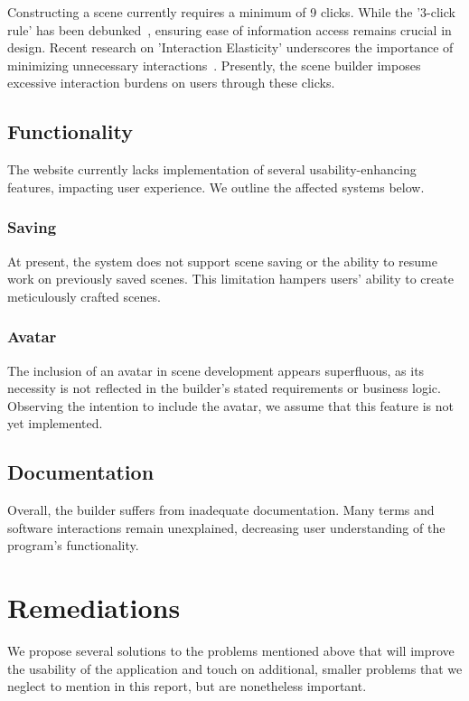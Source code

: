 \documentclass[sigart]{acmart_mod} %
\begin{document}
Constructing a scene currently requires a minimum of 9 clicks. While the '3-click rule' has been debunked~\cite{ThreeclickRule2023}, ensuring ease of information access remains crucial in design. Recent research on 'Interaction Elasticity' underscores the importance of minimizing unnecessary interactions~\cite{experienceInteractionElasticity}. Presently, the scene builder imposes excessive interaction burdens on users through these clicks.

\subsection{Functionality}

The website currently lacks implementation of several usability-enhancing features, impacting user experience. We outline the affected systems below.

\subsubsection{Saving}

At present, the system does not support scene saving or the ability to resume work on previously saved scenes. This limitation hampers users' ability to create meticulously crafted scenes.

\subsubsection{Avatar}

The inclusion of an avatar in scene development appears superfluous, as its necessity is not reflected in the builder's stated requirements or business logic. Observing the intention to include the avatar, we assume that this feature is not yet implemented.

\subsection{Documentation}

Overall, the builder suffers from inadequate documentation. Many terms and software interactions remain unexplained, decreasing user understanding of the program's functionality.

\section{Remediations}\label{remediations}
We propose several solutions to the problems mentioned above that will improve the usability of the application and touch on additional, smaller problems that we neglect to mention in this report, but are nonetheless important.
\end{document}
